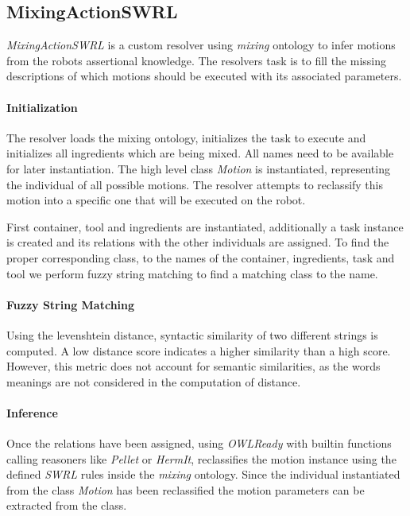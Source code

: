\subsection{MixingActionSWRL}
\label{subsection:MixingActionSWRL}
\textit{MixingActionSWRL} is a custom resolver using \textit{mixing} ontology to infer motions from the robots assertional knowledge.
The resolvers task is to fill the missing descriptions of which motions should be executed with its associated parameters.

\paragraph{Initialization}
The resolver loads the mixing ontology, initializes the task to execute and initializes all ingredients which are being mixed. 
All names need to be available for later instantiation.
The high level class \textit{Motion} is instantiated, representing the individual of all possible motions. 
The resolver attempts to reclassify this motion into a specific one that will be executed on the robot.

First container, tool and ingredients are instantiated, additionally a task instance is created and its relations with 
the other individuals are assigned. To find the proper corresponding class, to the names of the container, ingredients, task and tool
we perform fuzzy string matching to find a matching class to the name. 

\paragraph{Fuzzy String Matching}
Using the levenshtein distance, syntactic similarity of two different strings is computed. A low distance score
indicates a higher similarity than a high score. However, this metric does not account for semantic similarities, 
as the words meanings are not considered in the computation of distance.

\paragraph{Inference}
Once the relations have been assigned, using \textit{OWLReady} with builtin functions calling reasoners like \textit{Pellet} or \textit{HermIt},
reclassifies the motion instance using the defined \textit{SWRL} rules inside the \textit{mixing} ontology.
Since the individual instantiated from the class \textit{Motion} has been reclassified the motion parameters can be extracted from the class.

